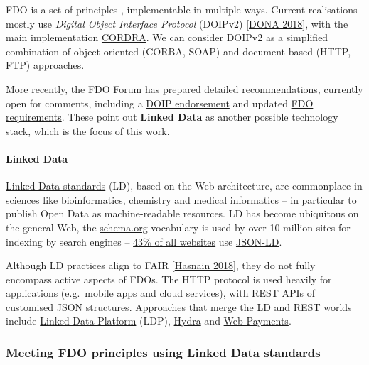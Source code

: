 FDO is a set of principles \cite{bonino2019}, implementable in multiple ways. Current realisations mostly
use \emph{Digital Object Interface Protocol} (DOIPv2)
{[}\href{https://hdl.handle.net/0.DOIP/DOIPV2.0}{DONA 2018}{]}, with the
main implementation
\href{https://www.cordra.org/documentation/api/doip.html}{CORDRA}. We
can consider DOIPv2 as a simplified combination of object-oriented
(CORBA, SOAP) and document-based (HTTP, FTP) approaches.

More recently, the \href{https://fairdo.org/}{FDO Forum} has prepared
detailed
\href{https://drive.google.com/drive/u/0/folders/1-SbZk7enOqjy2Rf57PMB-CQW7qMOUXgO}{recommendations},
currently open for comments, including a
\href{https://docs.google.com/document/d/10ESWe-m0ex7fIW0ZYOYeVg6gAcIaBKyO3W-Vg8tXzdw/edit\#}{DOIP
endorsement} and updated
\href{https://docs.google.com/document/d/1-4_yGRrIcgdMIwaFvHyUt6lxDdfzGpqLUCEihE0vJ-g/edit\#heading=h.gjdgxs}{FDO
requirements}. These point out \textbf{Linked Data} as another possible
technology stack, which is the focus of this work.

\hypertarget{linked-data}{%
\paragraph{Linked Data}\label{linked-data}}

\href{https://www.w3.org/standards/semanticweb/data}{Linked Data
standards} (LD), based on the Web architecture, are commonplace in
sciences like bioinformatics, chemistry and medical informatics -- in
particular to publish Open Data as machine-readable resources. LD has
become ubiquitous on the general Web, the
\href{https://schema.org/}{schema.org} vocabulary is used by over 10
million sites for indexing by search engines --
\href{https://w3techs.com/technologies/details/da-jsonld}{43\% of all
websites} use \href{https://json-ld.org/}{JSON-LD}.

Although LD practices align to FAIR
{[}\href{https://doi.org/10.1007/978-3-319-98192-5_60}{Hasnain 2018}{]},
they do not fully encompass active aspects of FDOs. The HTTP protocol is
used heavily for applications (e.g.~mobile apps and cloud services),
with REST APIs of customised \href{https://json-schema.org/}{JSON
structures}. Approaches that merge the LD and REST worlds include
\href{https://www.w3.org/TR/ldp/}{Linked Data Platform} (LDP),
\href{https://www.hydra-cg.com/}{Hydra} and
\href{https://www.w3.org/TR/webpayments-http-messages/}{Web Payments}.

\hypertarget{meeting-fdo-principles-using-linked-data-standards}{%
\subsubsection{Meeting FDO principles using Linked Data
standards}\label{meeting-fdo-principles-using-linked-data-standards}}

